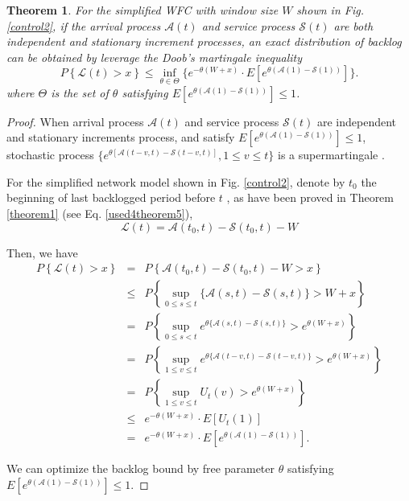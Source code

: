 \documentclass[paper]{ieice}
\newtheorem{theorem}{Theorem}
\newtheorem{proof}{Proof}
\begin{document}
\begin{theorem}\label{theorem3}
For the simplified WFC with window size $W$ shown in Fig. \ref{control2}, if the arrival process $\mathcal{A}(t)$ and service process $\mathcal{S}(t)$ are both independent and stationary increment processes, an exact distribution of backlog can be obtained by leverage the Doob's martingale inequality
\begin{equation}\label{eqn3}
P\left\{\mathcal{L}(t)>x\right\}\leq \inf_{\theta\in\Theta}\{e^{-\theta(W+x)}\cdot E[e^{\theta(\mathcal{A}(1)-\mathcal{S}(1))}]\}.
\end{equation}
where $\Theta$ is the set of $\theta$ satisfying $E[e^{\theta(\mathcal{A}(1)-\mathcal{S}(1))}]\leq 1$.
\end{theorem}
\begin{proof}
When arrival process $\mathcal{A}(t)$ and service process $\mathcal{S}(t)$ are independent and stationary increments process, and satisfy $E[e^{\theta(\mathcal{A}(1)-\mathcal{S}(1))}]\leq 1$, stochastic process $\{e^{\theta[\mathcal{A}(t-v,t)-\mathcal{S}(t-v,t)]},1\leq v\leq t\}$ is a supermartingale \cite{jiang2009network,Ciucu2007Network}.

For the simplified network model shown in Fig. \ref{control2}, denote by $t_{0}$ the beginning of last backlogged period before $t$ \cite{Fidl06}, as have been proved in Theorem \ref{theorem1} (see Eq. \ref{used4theorem5}),
$$\mathcal{L}(t)=\mathcal{A}(t_0,t)-\mathcal{S}(t_0,t)-W$$

Then, we have
\begin{eqnarray*}
P\left\{\mathcal{L}(t)>x\right\}  &=&P\left\{\mathcal{A}(t_{0},t)-\mathcal{S}(t_{0},t)-W>x\right\}\\
  &\leq& P\left\{\sup_{0\leq s\leq t}\{\mathcal{A}(s,t)-\mathcal{S}(s,t)\}>W+x\right\}\\
  &=& P\left\{\sup_{0\leq s< t}e^{\theta\{\mathcal{A}(s,t)-\mathcal{S}(s,t)\}}>e^{\theta(W+x)}\right\}\\
  &=& P\left\{\sup_{1\leq v\leq t}e^{\theta\{\mathcal{A}(t-v,t)-\mathcal{S}(t-v,t)\}}>e^{\theta(W+x)}\right\}\\
  &=& P\left\{\sup_{1\leq v\leq t}U_{t}(v)>e^{\theta(W+x)}\right\}\\
  &\leq& e^{-\theta(W+x)}\cdot E[U_{t}(1)]\\
  &=& e^{-\theta(W+x)}\cdot E[e^{\theta(\mathcal{A}(1)-\mathcal{S}(1))}].
\end{eqnarray*}

We can optimize the backlog bound by free parameter $\theta$ satisfying $E[e^{\theta(\mathcal{A}(1)-\mathcal{S}(1))}]\leq 1$.\QED
\end{proof}
\end{document}
